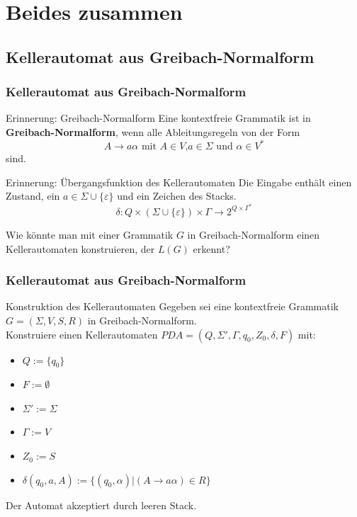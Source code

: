 \section{Beides zusammen}
\subsection{Kellerautomat aus Greibach-Normalform}
\begin{frame}
 \frametitle{Kellerautomat aus Greibach-Normalform}
 \begin{block}{Erinnerung: Greibach-Normalform}
  Eine kontextfreie Grammatik ist in \textbf{Greibach-Normalform}, wenn alle Ableitungsregeln von der Form   
  \[ A \rightarrow a\alpha \text{ mit } A \in V\text{,} a\in \Sigma \text{ und } \alpha \in V^*\]
  sind.
 \end{block}
 \pause
 \begin{block}{Erinnerung: Übergangsfunktion des Kellerautomaten}
 Die Eingabe enthält einen Zustand, ein $a \in \Sigma \cup \{\varepsilon\}$ und ein Zeichen des Stacks.
 \[\delta : Q \times ( \Sigma \cup \{\varepsilon\}) \times \Gamma \rightarrow 2^{Q \times \Gamma^*}\]
 \vspace{-0.5cm}
 \end{block}
 \pause
 Wie könnte man mit einer Grammatik $G$ in Greibach-Normalform einen Kellerautomaten konstruieren, der $L(G)$ erkennt?
\end{frame}

\begin{frame}
 \frametitle{Kellerautomat aus Greibach-Normalform}
 \begin{block}{Konstruktion des Kellerautomaten}
 Gegeben sei eine kontextfreie Grammatik \(G = (\Sigma, V, S, R)\) in Greibach-Normalform.\\
 Konstruiere einen Kellerautomaten \(PDA = (Q, \Sigma', \Gamma, q_0, Z_0, \delta, F)\) mit:
 \begin{itemize}
  \item $Q := \{q_0\}$
  \item $F := \emptyset$
  \item $\Sigma' := \Sigma$
  \item $\Gamma := V$
  \item $Z_0 := S$
  \item $\delta(q_0, a, A) :=  \{(q_0,\alpha) | (A \rightarrow a \alpha) \in R \}$
 \end{itemize}
 \end{block}
 \pause
 Der Automat akzeptiert durch leeren Stack.
\end{frame}

